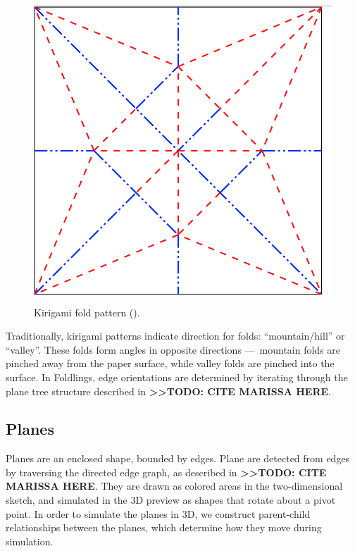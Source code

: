 \begin{figure}[htbp]
\centering
\includegraphics{figures/33_UI_Interface_Data_Structures/maekawas-theorem.png}
\caption{Kirigami fold pattern (\citet{maekawas-theorem}).}
\end{figure}

Traditionally, kirigami patterns indicate direction for folds:
``mountain/hill'' or ``valley''. These folds form angles in opposite
directions ---~mountain folds are pinched away from the paper surface,
while valley folds are pinched into the surface. In Foldlings, edge
orientations are determined by iterating through the plane tree
structure described in \textbf{\textgreater{}\textgreater{}TODO: CITE
MARISSA HERE}.

\subsection{Planes}\label{planes}

Planes are an enclosed shape, bounded by edges. Plane are detected from
edges by traversing the directed edge graph, as described in
\textbf{\textgreater{}\textgreater{}TODO: CITE MARISSA HERE}. They are
drawn as colored areas in the two-dimensional sketch, and simulated in
the 3D preview as shapes that rotate about a pivot point. In order to
simulate the planes in 3D, we construct parent-child relationships
between the planes, which determine how they move during simulation.

